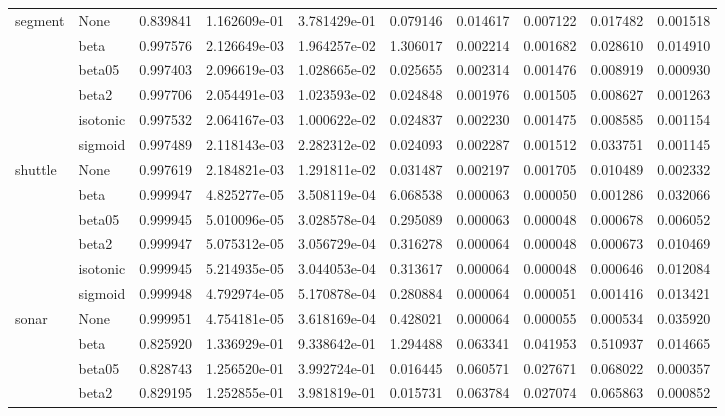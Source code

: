 \begin{tabular}{llrrrrrrrr}
segment & None &  0.839841 &  1.162609e-01 &  3.781429e-01 &   0.079146 &  0.014617 &  0.007122 &  0.017482 &  0.001518 \\
        & beta &  0.997576 &  2.126649e-03 &  1.964257e-02 &   1.306017 &  0.002214 &  0.001682 &  0.028610 &  0.014910 \\
        & beta05 &  0.997403 &  2.096619e-03 &  1.028665e-02 &   0.025655 &  0.002314 &  0.001476 &  0.008919 &  0.000930 \\
        & beta2 &  0.997706 &  2.054491e-03 &  1.023593e-02 &   0.024848 &  0.001976 &  0.001505 &  0.008627 &  0.001263 \\
        & isotonic &  0.997532 &  2.064167e-03 &  1.000622e-02 &   0.024837 &  0.002230 &  0.001475 &  0.008585 &  0.001154 \\
        & sigmoid &  0.997489 &  2.118143e-03 &  2.282312e-02 &   0.024093 &  0.002287 &  0.001512 &  0.033751 &  0.001145 \\
shuttle & None &  0.997619 &  2.184821e-03 &  1.291811e-02 &   0.031487 &  0.002197 &  0.001705 &  0.010489 &  0.002332 \\
        & beta &  0.999947 &  4.825277e-05 &  3.508119e-04 &   6.068538 &  0.000063 &  0.000050 &  0.001286 &  0.032066 \\
        & beta05 &  0.999945 &  5.010096e-05 &  3.028578e-04 &   0.295089 &  0.000063 &  0.000048 &  0.000678 &  0.006052 \\
        & beta2 &  0.999947 &  5.075312e-05 &  3.056729e-04 &   0.316278 &  0.000064 &  0.000048 &  0.000673 &  0.010469 \\
        & isotonic &  0.999945 &  5.214935e-05 &  3.044053e-04 &   0.313617 &  0.000064 &  0.000048 &  0.000646 &  0.012084 \\
        & sigmoid &  0.999948 &  4.792974e-05 &  5.170878e-04 &   0.280884 &  0.000064 &  0.000051 &  0.001416 &  0.013421 \\
sonar & None &  0.999951 &  4.754181e-05 &  3.618169e-04 &   0.428021 &  0.000064 &  0.000055 &  0.000534 &  0.035920 \\
        & beta &  0.825920 &  1.336929e-01 &  9.338642e-01 &   1.294488 &  0.063341 &  0.041953 &  0.510937 &  0.014665 \\
        & beta05 &  0.828743 &  1.256520e-01 &  3.992724e-01 &   0.016445 &  0.060571 &  0.027671 &  0.068022 &  0.000357 \\
        & beta2 &  0.829195 &  1.252855e-01 &  3.981819e-01 &   0.015731 &  0.063784 &  0.027074 &  0.065863 &  0.000852 \\

\end{tabular}
